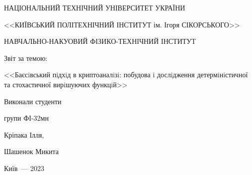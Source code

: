 
	\thispagestyle{empty}
	
	\begin{center}
		НАЦІОНАЛЬНИЙ ТЕХНІЧНИЙ УНІВЕРСИТЕТ УКРАЇНИ \par
		<<КИЇВСЬКИЙ ПОЛІТЕХНІЧНИЙ ІНСТИТУТ ім. Ігоря СІКОРСЬКОГО>>\par
		НАВЧАЛЬНО-НАКУОВИЙ ФІЗИКО-ТЕХНІЧНИЙ ІНСТИТУТ\par
		
		\vspace{60mm}
		{\huge Звіт за темою:\par
			\LARGE <<Баєсiвський пiдхiд в криптоаналiзi: побудова i
		дослiдження детермiнiстичної та стохастичної
		вирiшуючих функцiй>>\par}
		
	\end{center}
	
	\vspace{40mm}
	\begin{flushright}
		Виконали студенти
		
		групи ФІ-32мн
		
		Кріпака Ілля,

		Шашенок Микита
		
	\end{flushright}
	
	\vspace{33mm}
	\begin{center}
		{Київ~--- 2023}
	\end{center}
	